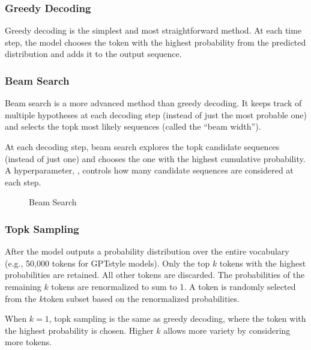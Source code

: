 \documentclass[letterpaper,11pt,english]{sphinxmanual}
\begin{document}
\subsubsection{Greedy Decoding}
\label{\detokenize{pretraining:greedy-decoding}}
\sphinxAtStartPar
Greedy decoding is the simplest and most straightforward method. At each
time step, the model chooses the token with the highest probability from
the predicted distribution and adds it to the output sequence.


\subsubsection{Beam Search}
\label{\detokenize{pretraining:beam-search}}
\sphinxAtStartPar
Beam search is a more advanced method than greedy decoding. It keeps
track of multiple hypotheses at each decoding step (instead of just the
most probable one) and selects the top\sphinxhyphen{}k most likely sequences (called
the “beam width”).

\sphinxAtStartPar
At each decoding step, beam search explores the top\sphinxhyphen{}k candidate
sequences (instead of just one) and chooses the one with the highest
cumulative probability. A hyperparameter, , controls how
many candidate sequences are considered at each step.

\begin{figure}[htbp]
\centering
\capstart

\noindent{}
\caption{Beam Search}\label{\detokenize{pretraining:id18}}\end{figure}


\subsubsection{Top\sphinxhyphen{}k Sampling}
\label{\detokenize{pretraining:top-k-sampling}}
\sphinxAtStartPar
After the model outputs a probability distribution over the entire
vocabulary (e.g., 50,000 tokens for GPT\sphinxhyphen{}style models). Only the top
\(k\) tokens with the highest probabilities are retained. All other
tokens are discarded. The probabilities of the remaining \(k\)
tokens are renormalized to sum to 1. A token is randomly selected from
the \(k\)\sphinxhyphen{}token subset based on the renormalized probabilities.

\sphinxAtStartPar
When \(k=1\), top\sphinxhyphen{}k sampling is the same as greedy decoding, where
the token with the highest probability is chosen. Higher \(k\)
allows more variety by considering more tokens.
\end{document}
